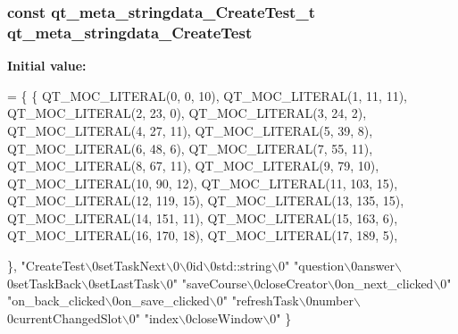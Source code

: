 \subsubsection[{qt\-\_\-meta\-\_\-stringdata\-\_\-\-Create\-Test}]{\setlength{\rightskip}{0pt plus 5cm}const {\bf qt\-\_\-meta\-\_\-stringdata\-\_\-\-Create\-Test\-\_\-t} qt\-\_\-meta\-\_\-stringdata\-\_\-\-Create\-Test\hspace{0.3cm}{\ttfamily [static]}}\label{_release_2moc__createtest_8cpp_aefb051a6e95585472027ef55abe8c459}
{\bfseries Initial value\-:}
\begin{DoxyCode}
= \{
    \{
QT_MOC_LITERAL(0, 0, 10),
QT_MOC_LITERAL(1, 11, 11),
QT_MOC_LITERAL(2, 23, 0),
QT_MOC_LITERAL(3, 24, 2),
QT_MOC_LITERAL(4, 27, 11),
QT_MOC_LITERAL(5, 39, 8),
QT_MOC_LITERAL(6, 48, 6),
QT_MOC_LITERAL(7, 55, 11),
QT_MOC_LITERAL(8, 67, 11),
QT_MOC_LITERAL(9, 79, 10),
QT_MOC_LITERAL(10, 90, 12),
QT_MOC_LITERAL(11, 103, 15),
QT_MOC_LITERAL(12, 119, 15),
QT_MOC_LITERAL(13, 135, 15),
QT_MOC_LITERAL(14, 151, 11),
QT_MOC_LITERAL(15, 163, 6),
QT_MOC_LITERAL(16, 170, 18),
QT_MOC_LITERAL(17, 189, 5),

    \},
    \textcolor{stringliteral}{"CreateTest\(\backslash\)0setTaskNext\(\backslash\)0\(\backslash\)0id\(\backslash\)0std::string\(\backslash\)0"}
    \textcolor{stringliteral}{"question\(\backslash\)0answer\(\backslash\)0setTaskBack\(\backslash\)0setLastTask\(\backslash\)0"}
    \textcolor{stringliteral}{"saveCourse\(\backslash\)0closeCreator\(\backslash\)0on\_next\_clicked\(\backslash\)0"}
    \textcolor{stringliteral}{"on\_back\_clicked\(\backslash\)0on\_save\_clicked\(\backslash\)0"}
    \textcolor{stringliteral}{"refreshTask\(\backslash\)0number\(\backslash\)0currentChangedSlot\(\backslash\)0"}
    \textcolor{stringliteral}{"index\(\backslash\)0closeWindow\(\backslash\)0"}
\}
\end{DoxyCode}
